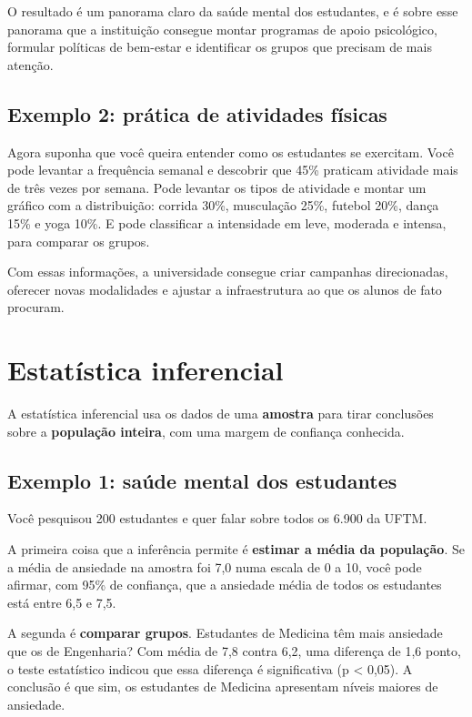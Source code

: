 \documentclass[
]{book}
\begin{document}
O resultado é um panorama claro da saúde mental dos estudantes, e é sobre esse panorama que a instituição consegue montar programas de apoio psicológico, formular políticas de bem-estar e identificar os grupos que precisam de mais atenção.

\subsection{Exemplo 2: prática de atividades físicas}\label{exemplo-2-pruxe1tica-de-atividades-fuxedsicas}

Agora suponha que você queira entender como os estudantes se exercitam. Você pode levantar a frequência semanal e descobrir que 45\% praticam atividade mais de três vezes por semana. Pode levantar os tipos de atividade e montar um gráfico com a distribuição: corrida 30\%, musculação 25\%, futebol 20\%, dança 15\% e yoga 10\%. E pode classificar a intensidade em leve, moderada e intensa, para comparar os grupos.

Com essas informações, a universidade consegue criar campanhas direcionadas, oferecer novas modalidades e ajustar a infraestrutura ao que os alunos de fato procuram.

\section{Estatística inferencial}\label{estatuxedstica-inferencial}

A estatística inferencial usa os dados de uma \textbf{amostra} para tirar conclusões sobre a \textbf{população inteira}, com uma margem de confiança conhecida.

\subsection{Exemplo 1: saúde mental dos estudantes}\label{exemplo-1-sauxfade-mental-dos-estudantes-1}

Você pesquisou 200 estudantes e quer falar sobre todos os 6.900 da UFTM.

A primeira coisa que a inferência permite é \textbf{estimar a média da população}. Se a média de ansiedade na amostra foi 7,0 numa escala de 0 a 10, você pode afirmar, com 95\% de confiança, que a ansiedade média de todos os estudantes está entre 6,5 e 7,5.

A segunda é \textbf{comparar grupos}. Estudantes de Medicina têm mais ansiedade que os de Engenharia? Com média de 7,8 contra 6,2, uma diferença de 1,6 ponto, o teste estatístico indicou que essa diferença é significativa (p \textless{} 0,05). A conclusão é que sim, os estudantes de Medicina apresentam níveis maiores de ansiedade.
\end{document}
